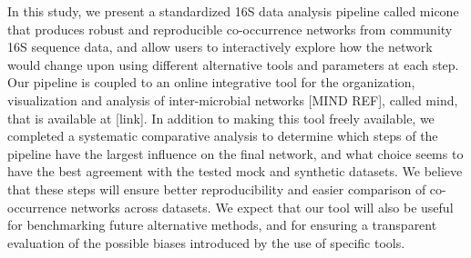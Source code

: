  In this study, we present a standardized 16S data analysis pipeline called \ac{micone} that produces robust and reproducible co-occurrence networks from community 16S sequence data, and allow users to interactively explore how the network would change upon using different alternative tools and parameters at each step.
 Our pipeline is coupled to an online integrative tool for the organization, visualization and analysis of inter-microbial networks [MIND REF], called \ac{mind}, that is available at [link].
  In addition to making this tool freely available, we completed a systematic comparative analysis to determine which steps of the pipeline have the largest influence on the final network, and what choice seems to have the best agreement with the tested mock and synthetic datasets.
  We believe that these steps will ensure better reproducibility and easier comparison of co-occurrence networks across datasets.
  We expect that our tool will also be useful for benchmarking future alternative methods, and for ensuring a transparent evaluation of the possible biases introduced by the use of specific tools.
